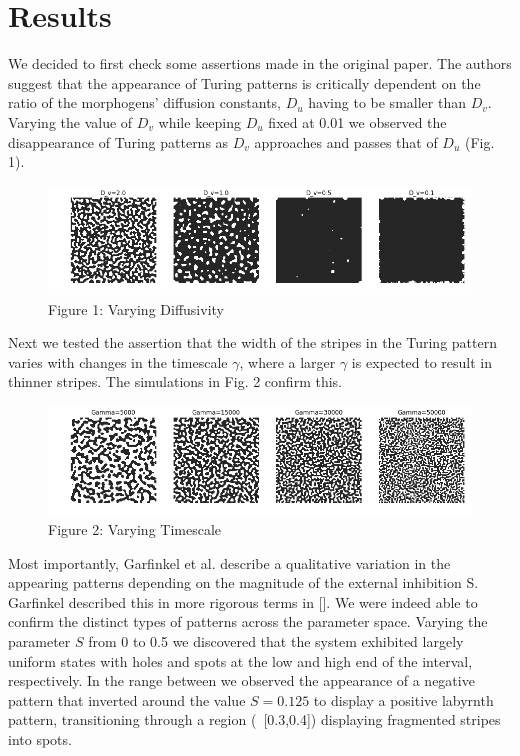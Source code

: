 \documentclass{article}
\begin{document}
\pagebreak

\section{Results}

We decided to first check some assertions made in the original paper. The authors suggest that the appearance of Turing patterns is critically dependent on the ratio of the morphogens' diffusion constants, $D_u$ having to be smaller than $D_v$. Varying the value of $D_v$ while keeping $D_u$ fixed at 0.01 we observed the disappearance of Turing patterns as $D_v$ approaches and passes that of $D_u$ (Fig. 1).

\begin{figure}[H]
  \includegraphics[width=\linewidth]{diffusivity.png}
  \caption{Figure 1: Varying Diffusivity}
  \label{fig:dv}
\end{figure}

Next we tested the assertion that the width of the stripes in the Turing pattern varies with changes in the timescale $\gamma$, where a larger $\gamma$ is expected to result in thinner stripes. The simulations in Fig. 2 confirm this.

\begin{figure}[H]
  \includegraphics[width=\linewidth]{timescale.png}
  \caption{Figure 2: Varying Timescale}
  \label{fig:gamma}
\end{figure}

Most importantly, Garfinkel et al. describe a qualitative variation in the appearing patterns depending on the magnitude of the external inhibition S. Garfinkel described this in more rigorous terms in []. We were indeed able to confirm the distinct types of patterns across the parameter space. Varying the parameter $S$ from 0 to 0.5 we discovered that the system exhibited largely uniform states with holes and spots at the low and high end of the interval, respectively. In the range between we observed the appearance of a negative pattern that inverted around the value $S=0.125$ to display a positive labyrnth pattern, transitioning through a region (~[0.3,0.4]) displaying fragmented stripes into spots.
\end{document}
